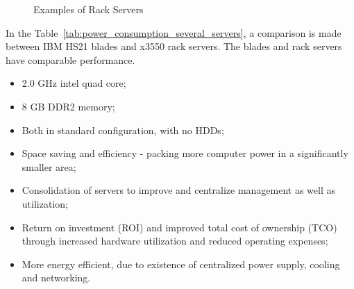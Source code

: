             \begin{figure}[h!tb]
                \centering
                \caption{Examples of Rack Servers}
                \label{fig:example_rack_server}
            \end{figure}
            In the Table~\ref{tab:power_consumption_several_servers}, a comparison is made between IBM HS21 blades and x3550 rack servers. The blades and rack servers have comparable performance.
            \begin{itemize}
                \item 2.0 GHz intel quad core;
                \item 8 GB DDR2 memory;
                \item Both in standard configuration, with no HDDs;
                \item Space saving and efficiency - packing more computer power in a significantly smaller area;
                \item Consolidation of servers to improve and centralize management as well as utilization;
                \item Return on investment (ROI) and improved total cost of ownership (TCO) through increased hardware utilization and reduced operating expenses;
                \item More energy efficient, due to existence of centralized power supply, cooling and networking.
            \end{itemize}
            
